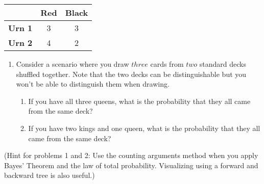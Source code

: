 \documentclass[
]{article}
\providecommand{\tightlist}{%
  \setlength{\itemsep}{0pt}\setlength{\parskip}{0pt}}
\begin{document}
\begin{longtable}[]{@{}ccc@{}}
\toprule()
& \textbf{Red} & \textbf{Black} \\
\midrule()
\endhead
\textbf{Urn 1} & 3 & 3 \\
\textbf{Urn 2} & 4 & 2 \\
\bottomrule()
\end{longtable}

\begin{enumerate}
\def\labelenumi{\arabic{enumi}.}
\setcounter{enumi}{1}
\item
  Consider a scenario where you draw \(three\) cards from \(two\) standard decks shuffled together. Note that the two decks can be distinguishable but you won't be able to distinguish them when drawing.

  \begin{enumerate}
  \def\labelenumii{\alph{enumii}.}
  \tightlist
  \item
    If you have all three queens, what is the probability that they all came from the same deck?
  \item
    If you have two kings and one queen, what is the probability that they all came from the same deck?
  \end{enumerate}
\end{enumerate}

\hfill\break

(Hint for problems 1 and 2: Use the counting arguments method when you apply Bayes' Theorem and the law of total probability. Visualizing using a forward and backward tree is also useful.)
\end{document}
